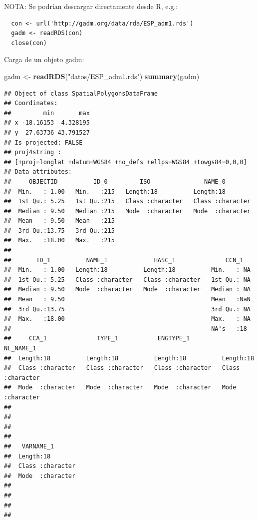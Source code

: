 \documentclass[
]{book}
\newenvironment{Shaded}{\begin{snugshade}}{\end{snugshade}}
\newcommand{\FunctionTok}[1]{\textcolor[rgb]{0.13,0.29,0.53}{\textbf{#1}}}
\newcommand{\NormalTok}[1]{#1}
\newcommand{\OtherTok}[1]{\textcolor[rgb]{0.56,0.35,0.01}{#1}}
\newcommand{\StringTok}[1]{\textcolor[rgb]{0.31,0.60,0.02}{#1}}
\theoremstyle{break}
\theoremstyle{definition}
\theoremstyle{definition}
\theoremstyle{definition}
\theoremstyle{definition}
\theoremstyle{remark}
\begin{document}
NOTA: Se podrían descargar directamente desde R, e.g.:

\begin{verbatim}
  con <- url('http://gadm.org/data/rda/ESP_adm1.rds')
  gadm <- readRDS(con)
  close(con)
\end{verbatim}

Carga de un objeto gadm:

\begin{Shaded}
\begin{Highlighting}[]
\NormalTok{gadm }\OtherTok{\textless{}{-}} \FunctionTok{readRDS}\NormalTok{(}\StringTok{"datos/ESP\_adm1.rds"}\NormalTok{) }
\FunctionTok{summary}\NormalTok{(gadm)}
\end{Highlighting}
\end{Shaded}

\begin{verbatim}
## Object of class SpatialPolygonsDataFrame
## Coordinates:
##         min       max
## x -18.16153  4.328195
## y  27.63736 43.791527
## Is projected: FALSE 
## proj4string :
## [+proj=longlat +datum=WGS84 +no_defs +ellps=WGS84 +towgs84=0,0,0]
## Data attributes:
##     OBJECTID          ID_0         ISO               NAME_0         
##  Min.   : 1.00   Min.   :215   Length:18          Length:18         
##  1st Qu.: 5.25   1st Qu.:215   Class :character   Class :character  
##  Median : 9.50   Median :215   Mode  :character   Mode  :character  
##  Mean   : 9.50   Mean   :215                                        
##  3rd Qu.:13.75   3rd Qu.:215                                        
##  Max.   :18.00   Max.   :215                                        
##                                                                     
##       ID_1          NAME_1             HASC_1              CCN_1    
##  Min.   : 1.00   Length:18          Length:18          Min.   : NA  
##  1st Qu.: 5.25   Class :character   Class :character   1st Qu.: NA  
##  Median : 9.50   Mode  :character   Mode  :character   Median : NA  
##  Mean   : 9.50                                         Mean   :NaN  
##  3rd Qu.:13.75                                         3rd Qu.: NA  
##  Max.   :18.00                                         Max.   : NA  
##                                                        NA's   :18   
##     CCA_1              TYPE_1           ENGTYPE_1          NL_NAME_1        
##  Length:18          Length:18          Length:18          Length:18         
##  Class :character   Class :character   Class :character   Class :character  
##  Mode  :character   Mode  :character   Mode  :character   Mode  :character  
##                                                                             
##                                                                             
##                                                                             
##                                                                             
##   VARNAME_1        
##  Length:18         
##  Class :character  
##  Mode  :character  
##                    
##                    
##                    
## 
\end{verbatim}
\end{document}
